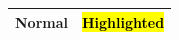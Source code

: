 \documentclass{article}
\begin{document}
\begin{tabular}{ll}
\hline
Normal & \hl{Highlighted} \\
\hline
\end{tabular}
\end{document}

